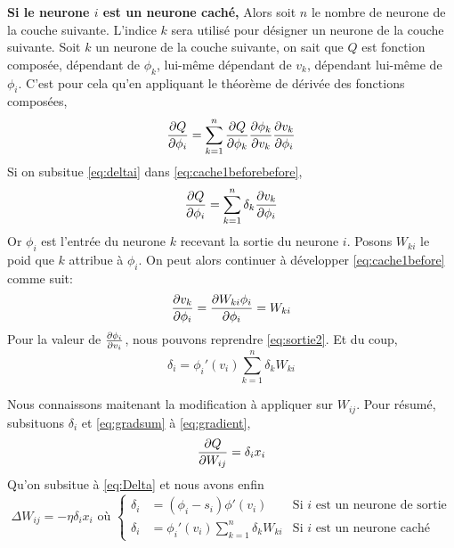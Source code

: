 \textbf{Si le neurone $i$ est un neurone caché,}
Alors soit $n$ le nombre de neurone de la couche suivante.
L'indice $k$ sera utilisé pour désigner un neurone de la couche suivante.
Soit $k$ un neurone de la couche suivante, on sait que $Q$ est fonction composée,
dépendant de $\phi_k$, lui-même dépendant de $v_k$, dépendant lui-même de $\phi_i$.
C'est pour cela qu'en appliquant le théorème de dérivée des fonctions composées,
\begin{equation}\label{eq:cache1beforebefore}
 \frac{\partial Q}{\partial \phi_i} = \sum_{k=1}^{n} \frac{\partial Q}{\partial \phi_k} \frac{\partial \phi_k}{\partial v_k} \frac{\partial v_k}{\partial \phi_i}
\end{equation}
Si on subsitue \eqref{eq:deltai} dans \eqref{eq:cache1beforebefore},
\begin{equation}\label{eq:cache1before}
 \frac{\partial Q}{\partial \phi_i} = \sum_{k=1}^{n} \delta_k \frac{\partial v_k}{\partial \phi_i}
\end{equation}
Or $\phi_i$ est l'entrée du neurone $k$ recevant la sortie du neurone $i$. Posons $W_{ki}$ le poid que $k$ attribue à $\phi_i$.
On peut alors continuer à développer \eqref{eq:cache1before} comme suit:
\begin{equation}\label{eq:cache1}
 \frac{\partial v_k}{\partial \phi_i} = \frac{\partial W_{ki}\phi_i}{\partial \phi_i} = W_{ki}
\end{equation}
Pour la valeur de $\frac{\partial \phi_i}{\partial v_i}$, nous pouvons reprendre \eqref{eq:sortie2}.
Et du coup, \[\delta_i = \phi_i'(v_i) \sum_{k=1}^{n} \delta_k W_{ki}\]

Nous connaissons maitenant la modification à appliquer sur $W_{ij}$. Pour résumé, subsituons $\delta_i$ et \eqref{eq:gradsum} à \eqref{eq:gradient},
\begin{equation}\label{eq:subgradient}
 \frac{\partial Q}{\partial W_{ij}} = \delta_i x_i
\end{equation}
Qu'on subsitue à \eqref{eq:Delta} et nous avons enfin
\begin{equation}\label{eq:mlpretro}
 \Delta W_{ij} = -\eta \delta_i x_i \text{~où~}\left\{
  \begin{array}{lll}
   \delta_i & = (\phi_i - s_i)\phi'(v_i) & \text{Si~} i \text{~est un neurone de sortie}\\
   \delta_i & = \phi_i'(v_i) \sum_{k=1}^{n} \delta_k W_{ki} & \text{Si~} i \text{~est un neurone caché}
  \end{array}
 \right.
\end{equation}
